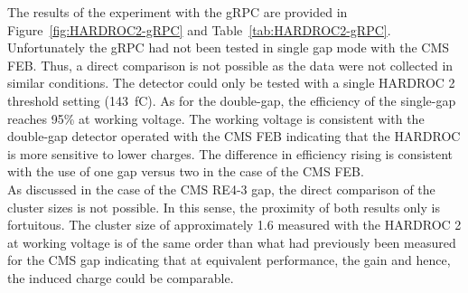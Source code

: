 	The results of the experiment with the gRPC are provided in Figure~\ref{fig:HARDROC2-gRPC} and Table~\ref{tab:HARDROC2-gRPC}. Unfortunately the gRPC had not been tested in single gap mode with the CMS FEB. Thus, a direct comparison is not possible as the data were not collected in similar conditions. The detector could only be tested with a single HARDROC 2 threshold setting (\SI{143}{fC}). As for the double-gap, the efficiency of the single-gap reaches 95\% at working voltage. The working voltage is consistent with the double-gap detector operated with the CMS FEB indicating that the HARDROC is more sensitive to lower charges. The difference in efficiency rising is consistent with the use of one gap versus two in the case of the CMS FEB.\\
	As discussed in the case of the CMS RE4-3 gap, the direct comparison of the cluster sizes is not possible. In this sense, the proximity of both results only is fortuitous. The cluster size of approximately 1.6 measured with the HARDROC 2 at working voltage is of the same order than what had previously been measured for the CMS gap indicating that at equivalent performance, the gain and hence, the induced charge could be comparable.
	
